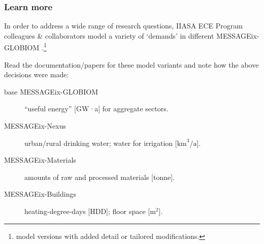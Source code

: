 \documentclass[12pt,aspectratio=169]{beamer}
\begin{document}
\begin{frame}
\frametitle{Learn more}
In order to address a wide range of research questions, IIASA ECE Program colleagues \& collaborators model a variety of ‘demands’ in different MESSAGEix-GLOBIOM .\footnote{model versions with added detail or tailored modifications.}

\bigskip
Read the documentation/papers for these model variants and note how the above decisions were made:

\begin{description}
  \item [base MESSAGEix-GLOBIOM] “useful energy” [GW·a] for aggregate sectors.
  \item [MESSAGEix-Nexus] urban/rural drinking water; water for irrigation [$\text{km}^3 / \text{a}$].
  \item [MESSAGEix-Materials] amounts of raw and processed materials [tonne].
  \item [MESSAGEix-Buildings] heating-degree-days [HDD]; floor space [$\text{m}^2$].
\end{description}

\end{frame}

\begin{frame}[plain]
  \centering \Huge {}
\end{frame}
\end{document}
